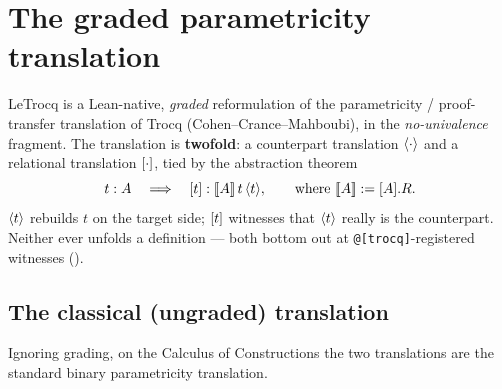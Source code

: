 %
%

\chapter{The graded parametricity translation}
\label{chap:translation}

LeTrocq is a Lean-native, \emph{graded} reformulation of the parametricity /
proof-transfer translation of Trocq (Cohen--Crance--Mahboubi), in the
\emph{no-univalence} fragment. The translation is \textbf{twofold}: a
counterpart translation $\langle \cdot \rangle$ and a relational translation
$[ \cdot ]$, tied by the abstraction theorem
\[
  t : A \quad\Longrightarrow\quad [ t ] : [\![ A ]\!]\, t\, \langle t \rangle,
  \qquad\text{where } [\![ A ]\!] := [ A ].R .
\]
$\langle t \rangle$ rebuilds $t$ on the target side; $[ t ]$ witnesses that $\langle t \rangle$
really is the counterpart. Neither ever unfolds a definition --- both bottom out
at \texttt{@[trocq]}-registered witnesses ().

\section{The classical (ungraded) translation}
\label{sec:classical}

Ignoring grading, on the Calculus of Constructions the two translations are the
standard binary parametricity translation.

